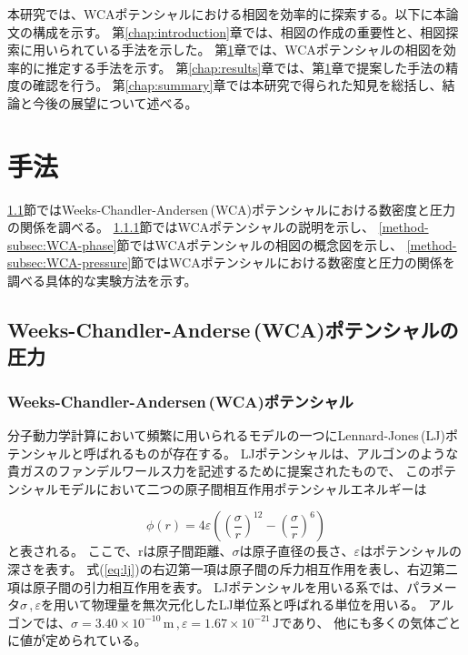 \documentclass[titlepage]{jsreport}
\begin{document}
本研究では、WCAポテンシャルにおける相図を効率的に探索する。以下に本論文の構成を示す。
第\ref{chap:introduction}章では、相図の作成の重要性と、相図探索に用いられている手法を示した。
第\ref{chap:method}章では、WCAポテンシャルの相図を効率的に推定する手法を示す。
第\ref{chap:results}章では、第\ref{chap:method}章で提案した手法の精度の確認を行う。
第\ref{chap:summary}章では本研究で得られた知見を総括し、結論と今後の展望について述べる。




\chapter{手法} \label{chap:method}
\ref{method-sec:WCA-press}節ではWeeks-Chandler-Andersen\,(WCA)ポテンシャルにおける数密度と圧力の関係を調べる。
\ref{method-subsec:WCA}節ではWCAポテンシャルの説明を示し、
\ref{method-subsec:WCA-phase}節ではWCAポテンシャルの相図の概念図を示し、
\ref{method-subsec:WCA-pressure}節ではWCAポテンシャルにおける数密度と圧力の関係を調べる具体的な実験方法を示す。

\section{Weeks-Chandler-Anderse\,(WCA)ポテンシャルの圧力}\label{method-sec:WCA-press}


\subsection{Weeks-Chandler-Andersen\,(WCA)ポテンシャル}\label{method-subsec:WCA}
分子動力学計算において頻繁に用いられるモデルの一つにLennard-Jones\,(LJ)ポテンシャルと呼ばれるものが存在する。
LJポテンシャルは、アルゴンのような貴ガスのファンデルワールス力を記述するために提案\cite{Lennard_Jones_1931}されたもので、
このポテンシャルモデルにおいて二つの原子間相互作用ポテンシャルエネルギーは

\large
\begin{equation}
\phi(r)=4{\varepsilon}\left(\left(\frac{\sigma}{r}\right)^{12}-\left(\frac{\sigma}{r}\right)^6\right)\label{eq:lj}
\end{equation}
\normalsize
と表される。
ここで、rは原子間距離、${\sigma}$は原子直径の長さ、${\varepsilon}$はポテンシャルの深さを表す。
式(\ref{eq:lj})の右辺第一項は原子間の斥力相互作用を表し、右辺第二項は原子間の引力相互作用を表す。
LJポテンシャルを用いる系では、パラメータ$\sigma$\,,\,$\varepsilon$を用いて物理量を無次元化したLJ単位系と呼ばれる単位を用いる。
アルゴンでは、${\sigma}=3.40×10^{-10}\,\mathrm{m}$\,,\,${\varepsilon}=1.67×10^{-21}\,\mathrm{J}$であり\cite{argon-parameters}、
他にも多くの気体ごとに値が定められている\cite{graphane-parameters,many-parameters}。
\end{document}
